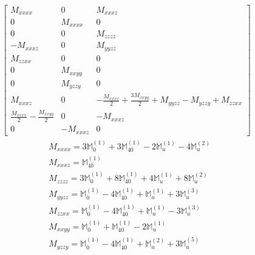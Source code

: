 \documentclass[fleqn,8pt,landscape]{jsarticle}
\begin{document}
\begin{align*}
\begin{bmatrix} M_{xxxx} & 0 & M_{xxxz} \\ 0 & M_{xxxx} & 0 \\ 0 & 0 & M_{zzzz} \\ - M_{xxxz} & 0 & M_{yyzz} \\ M_{zzxx} & 0 & 0 \\ 0 & M_{xxyy} & 0 \\ 0 & M_{yzzy} & 0 \\ M_{xxxz} & 0 & - \frac{M_{xxxx}}{2} + \frac{3 M_{xxyy}}{2} + M_{yyzz} - M_{yzzy} + M_{zzxx} \\ \frac{M_{xxxx}}{2} - \frac{M_{xxyy}}{2} & 0 & - M_{xxxz} \\ 0 & - M_{xxxz} & 0 \end{bmatrix}
\end{align*}
\begin{align*}
& M_{xxxx} = 3 \mathbb{M}_{0}^{(1)} + 3 \mathbb{M}_{40}^{(1)} - 2 \mathbb{M}_{u}^{(1)} - 4 \mathbb{M}_{u}^{(2)} \\
& M_{xxxz} = \mathbb{M}_{4b}^{(1)} \\
& M_{zzzz} = 3 \mathbb{M}_{0}^{(1)} + 8 \mathbb{M}_{40}^{(1)} + 4 \mathbb{M}_{u}^{(1)} + 8 \mathbb{M}_{u}^{(2)} \\
& M_{yyzz} = \mathbb{M}_{0}^{(1)} - 4 \mathbb{M}_{40}^{(1)} + \mathbb{M}_{u}^{(1)} + 3 \mathbb{M}_{u}^{(3)} \\
& M_{zzxx} = \mathbb{M}_{0}^{(1)} - 4 \mathbb{M}_{40}^{(1)} + \mathbb{M}_{u}^{(1)} - 3 \mathbb{M}_{u}^{(3)} \\
& M_{xxyy} = \mathbb{M}_{0}^{(1)} + \mathbb{M}_{40}^{(1)} - 2 \mathbb{M}_{u}^{(1)} \\
& M_{yzzy} = \mathbb{M}_{0}^{(1)} - 4 \mathbb{M}_{40}^{(1)} + \mathbb{M}_{u}^{(2)} + 3 \mathbb{M}_{u}^{(5)}
\end{align*}
\end{document}
